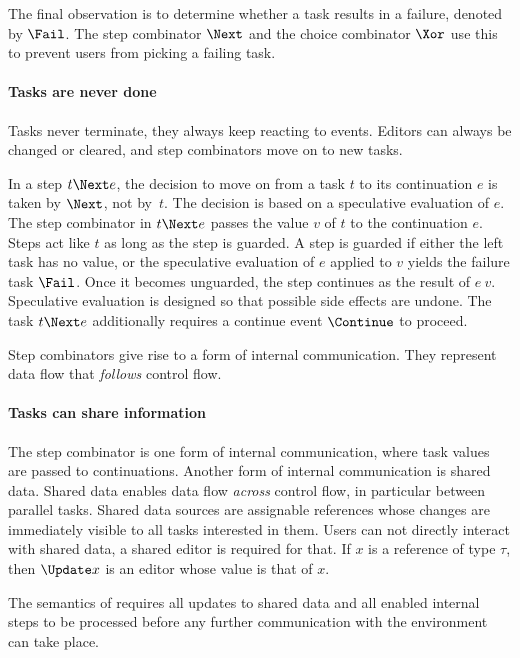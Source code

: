 The final observation is to determine whether a task results in a failure, denoted by $\Fail$.
The step combinator $\Next$ and the choice combinator $\Xor$ use this to prevent users from picking a failing task.



\paragraph{Tasks are never done}

Tasks never terminate, they always keep reacting to events.
Editors can always be changed or cleared, and step combinators move on to new tasks.

In a step $t \Next e$, the decision to move on from a task $t$ to its continuation $e$ is taken by $\Next$, not by~$t$.
The decision is based on a speculative evaluation of $e$.
The step combinator in $t \Next e$ passes the value $v$ of $t$ to the continuation $e$.
Steps act like $t$ as long as the step is guarded.
A step is guarded if either the left task has no value, or the speculative evaluation of $e$ applied to $v$ yields the failure task $\Fail$.
Once it becomes unguarded, the step continues as the result of $e\ v$.
Speculative evaluation is designed so that possible side effects are undone.
The task $t \Next e$ additionally requires a continue event $\Continue$ to proceed.

Step combinators give rise to a form of internal communication.
They represent data flow that \emph{follows} control flow.


\paragraph{Tasks can share information}

The step combinator is one form of internal communication, where task values are passed to continuations.
Another form of internal communication is shared data.
Shared data enables data flow \emph{across} control flow, in particular between parallel tasks.
Shared data sources are assignable references whose changes are immediately visible to all tasks interested in them.
Users can not directly interact with shared data, a shared editor is required for that.
If $x$ is a reference of type $\tau$, then $\Update x$ is an editor whose value is that of $x$.

The semantics of \TOPHAT requires all updates to shared data and all enabled internal steps to be processed before any further communication with the environment can take place.



